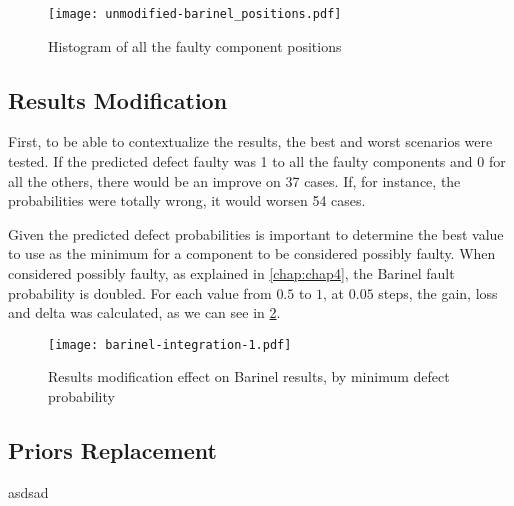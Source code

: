 \begin{figure}
  \begin{center}
    \leavevmode
    \texttt{[image: unmodified-barinel\_positions.pdf]}
    \caption{Histogram of all the faulty component positions}
    \label{fig:fault-positions}
  \end{center}
\end{figure}


\subsection{Results Modification}

First, to be able to contextualize the results, the best and worst scenarios were tested. If the predicted defect faulty was 1 to all the faulty components and 0 for all the others, there would be an improve on 37 cases. If, for instance, the probabilities were totally wrong, it would worsen 54 cases.

Given the predicted defect probabilities is important to determine the best value to use as the minimum for a component to be considered possibly faulty. When considered possibly faulty, as explained in \ref{chap:chap4}, the Barinel fault probability is doubled. For each value from $0.5$ to $1$, at $0.05$ steps, the gain, loss and delta was calculated, as we can see in \ref{fig:results-modification}.

\begin{figure}
  \begin{center}
    \leavevmode
    \texttt{[image: barinel-integration-1.pdf]}
    \caption{Results modification effect on Barinel results, by minimum defect probability}
    \label{fig:results-modification}
  \end{center}
\end{figure}


\subsection{Priors Replacement}

asdsad




